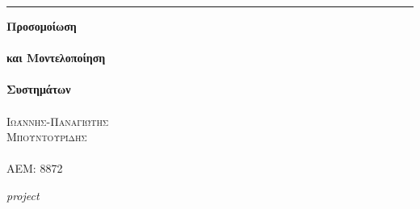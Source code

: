 \documentclass{article}
\date{}
\begin{document}
\begin{titlepage} %
	
	\raggedleft %
	
	\rule{1pt}{\textheight} %
	\hspace{0.05\textwidth} %
	\parbox[b]{0.75\textwidth}{ %
		
		{\Huge\bfseries Προσομοίωση \\ \\
		και Μοντελοποίηση\\ \\ Συστημάτων}\\[2\baselineskip] %
		{\large\textit{ }}\\[4\baselineskip] %
		{\Large\textsc{Ιωάννης-Παναγιώτης \\Μπουντουρίδης}} %
	\\	\\{\large\textsc{ΑΕΜ: 8872}} %
		
		\vspace{0.5\textheight} %
		
		{\noindent \textit{project}}\\[\baselineskip] %
	}

\end{titlepage}
\newpage
\end{document}
